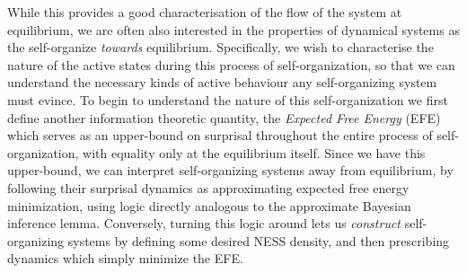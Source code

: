 While this provides a good characterisation of the flow of the system at equilibrium, we are often also interested in the properties of dynamical systems as the self-organize \emph{towards} equilibrium. Specifically, we wish to characterise the nature of the active states during this process of self-organization, so that we can understand the necessary kinds of active behaviour any self-organizing system must evince. To begin to understand the nature of this self-organization we first define another information theoretic quantity, the \emph{Expected Free Energy} (EFE) which serves as an upper-bound on surprisal throughout the entire process of self-organization, with equality only at the equilibrium itself. Since we have this upper-bound, we can interpret self-organizing systems away from equilibrium, by following their surprisal dynamics as approximating expected free energy minimization, using logic directly analogous to the approximate Bayesian inference lemma. Conversely, turning this logic around lets us \emph{construct} self-organizing systems by defining some desired NESS density, and then prescribing dynamics which simply minimize the EFE.

